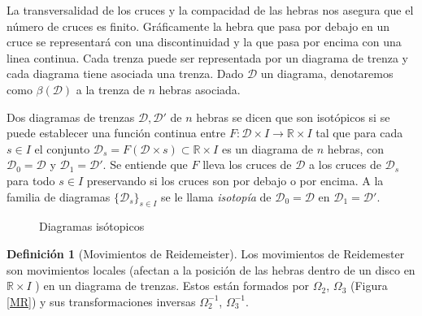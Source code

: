 \documentclass[12pt]{book}
\theoremstyle{definition}
\newtheorem{defi}{Definición}[section]
\begin{document}
La transversalidad de los cruces y la compacidad de las hebras nos asegura que el número de cruces es finito. Gráficamente la hebra que pasa por debajo en un cruce se representará con una discontinuidad y la que pasa por encima con una linea continua. Cada trenza puede ser representada por un diagrama de trenza y cada diagrama tiene asociada una trenza. Dado $\mathcal{D}$ un diagrama, denotaremos como $\beta(\mathcal{D})$ a la trenza de $n$ hebras asociada.

Dos diagramas de trenzas $\mathcal{D}, \mathcal{D}'$ de $n$ hebras se dicen que son isotópicos si se puede establecer una función continua entre $F:\mathcal{D}\times I\rightarrow\mathbb{R}\times I$ tal que para cada $s\in I$ el conjunto $\mathcal{D}_s = F(\mathcal{D}\times s)\subset\mathbb{R}\times I$ es un diagrama de $n$ hebras, con $\mathcal{D}_0 = \mathcal{D}$ y $\mathcal{D}_1 = \mathcal{D}'$. Se entiende que $F$ lleva los cruces de $\mathcal{D}$ a los cruces de $\mathcal{D}_s$ para todo $s\in I$ preservando si los cruces son por debajo o por encima. A la familia de diagramas $\{\mathcal{D}_s\}_{s\in I}$ se le llama \textit{isotopía} de $\mathcal{D}_0 = \mathcal{D}$ en $\mathcal{D}_1 = \mathcal{D}'$.




\begin{figure}[h!]
\centering
{}
\caption{Diagramas isótopicos}
\label{fig:d_iso}
\end{figure}







\begin{defi}[Movimientos de Reidemeister]  Los movimientos de Reidemester  son movimientos locales (afectan a la posición de las hebras dentro de un disco en 
$ \mathbb{R}\times I $ ) en un diagrama de trenzas. Estos están formados por $\Omega_2$, $\Omega_3$ (Figura \ref{MR}) y sus transformaciones inversas
$\Omega_2^{-1}$, $\Omega_3^{-1}$. 

\end{defi}
\end{document}
